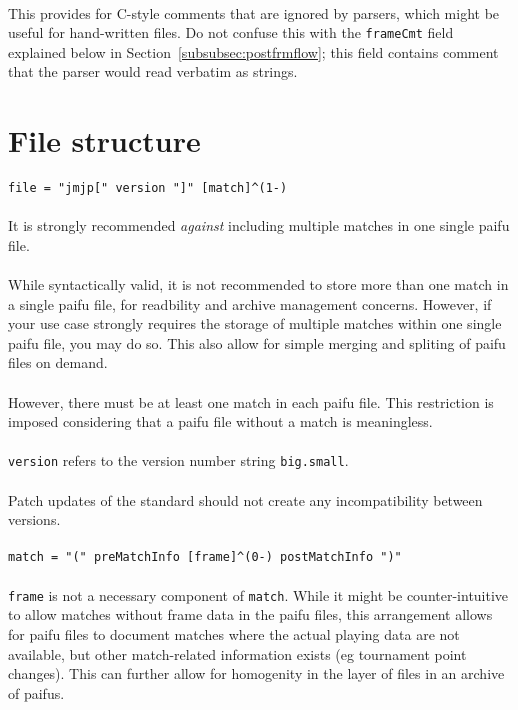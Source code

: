 \documentclass[%
	a4paper%
	,10pt%
	,twoside%
	,notitlepage%
]{article}%
\newcommand*{\ruleSymbol}{\textjapanese{⚠}}%
\newcommand*{\ruleMargin}{\marginpar{\flushright{}\ruleSymbol{}}}%
\newcommand*{\rulePar}{\paragraph*{\ruleMargin{}}}%
\begin{document}
		\paragraph*{}This provides for C-style comments that are ignored by parsers, which might be useful for hand-written files. Do not confuse this with the \lstinline/frameCmt/ field explained below in Section~\ref{subsubsec:postfrmflow}; this field contains comment that the parser would read verbatim as strings. %
\section{File structure}%
% 
	\rulePar{}\lstinline/file = "jmjp[" version "]" [match]^(1-)/%
	\rulePar{}It is strongly recommended \textit{against} including multiple matches in one single paifu file. %
	\paragraph*{}While syntactically valid, it is not recommended to store more than one match in a single paifu file, for readbility and archive management concerns. However, if your use case strongly requires the storage of multiple matches within one single paifu file, you may do so. This also allow for simple merging and spliting of paifu files on demand. %
	\paragraph*{}However, there must be at least one match in each paifu file. This restriction is imposed considering that a paifu file without a match is meaningless. %
	\rulePar{}\lstinline/version/ refers to the version number string \texttt{big.small}. %
	\rulePar{}Patch updates of the standard should not create any incompatibility between versions. %
	\rulePar{}\lstinline/match = "(" preMatchInfo [frame]^(0-) postMatchInfo ")"/%
	\paragraph*{}\lstinline/frame/ is not a necessary component of \lstinline/match/. While it might be counter-intuitive to allow matches without frame data in the paifu files, this arrangement allows for paifu files to document matches where the actual playing data are not available, but other match-related information exists (eg tournament point changes). This can further allow for homogenity in the layer of files in an archive of paifus. %
\end{document}
